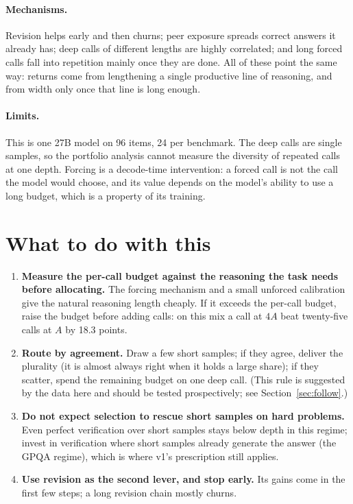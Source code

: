 \documentclass[11pt]{article}
\begin{document}
\paragraph{Mechanisms.} Revision helps early and then churns; peer exposure spreads correct answers it already
has; deep calls of different lengths are highly correlated; and long forced calls fall into repetition mainly
once they are done. All of these point the same way: returns come from lengthening a single productive line
of reasoning, and from width only once that line is long enough.

\paragraph{Limits.} This is one 27B model on 96 items, 24 per benchmark. The deep calls are single samples, so
the portfolio analysis cannot measure the diversity of repeated calls at one depth. Forcing is a decode-time
intervention: a forced call is not the call the model would choose, and its value depends on the model's
ability to use a long budget, which is a property of its training.

\section{What to do with this}

\begin{enumerate}
\item \textbf{Measure the per-call budget against the reasoning the task needs before allocating.} The forcing
mechanism and a small unforced calibration give the natural reasoning length cheaply. If it exceeds the
per-call budget, raise the budget before adding calls: on this mix a call at $4A$ beat twenty-five calls at $A$
by 18.3 points.
\item \textbf{Route by agreement.} Draw a few short samples; if they agree, deliver the plurality (it is almost
always right when it holds a large share); if they scatter, spend the remaining budget on one deep call. (This rule is suggested by the data here and should be tested
prospectively; see Section~\ref{sec:follow}.)
\item \textbf{Do not expect selection to rescue short samples on hard problems.} Even perfect verification over
short samples stays below depth in this regime; invest in verification where short samples already generate
the answer (the GPQA regime), which is where v1's prescription still applies.
\item \textbf{Use revision as the second lever, and stop early.} Its gains come in the first few steps; a long
revision chain mostly churns.
\end{enumerate}
\end{document}

